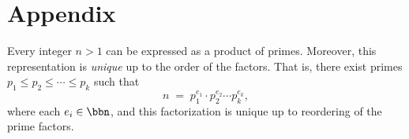 \chapter{Appendix}

\begin{theorem}
    Every integer $n > 1$ can be expressed as a product of primes. Moreover,
this representation is \emph{unique} up to the order of the factors. That
is, there exist primes $p_1 \leq p_2 \leq \cdots \leq p_k$ such that
\[
    n \;=\; p_1^{e_1} \cdot p_2^{e_2} \cdots p_k^{e_k},
\]
where each $e_i \in \bbn$, and this factorization is unique
up to reordering of the prime factors.
\end{theorem}